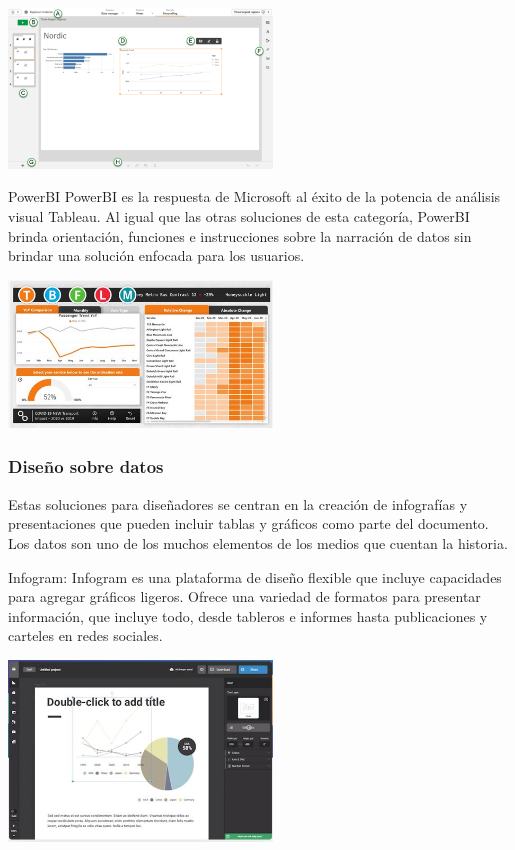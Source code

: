 \documentclass[twoside,twocolumn]{article}
\begin{document}
\includegraphics[width=7cm]{imagenes/img6.png}

PowerBI
PowerBI es la respuesta de Microsoft al éxito de la potencia de análisis visual Tableau. Al igual que las otras soluciones de esta categoría, PowerBI brinda orientación, funciones e instrucciones sobre la narración de datos sin brindar una solución enfocada para los usuarios. 

\includegraphics[width=7cm]{imagenes/img7.png}



\subsubsection{Diseño sobre datos}
Estas soluciones para diseñadores se centran en la creación de infografías y presentaciones que pueden incluir tablas y gráficos como parte del documento. Los datos son uno de los muchos elementos de los medios que cuentan la historia.

Infogram: Infogram es una plataforma de diseño flexible que incluye capacidades para agregar gráficos ligeros. Ofrece una variedad de formatos para presentar información, que incluye todo, desde tableros e informes hasta publicaciones y carteles en redes sociales.

\includegraphics[width=7cm]{imagenes/img8.png}
\end{document}

